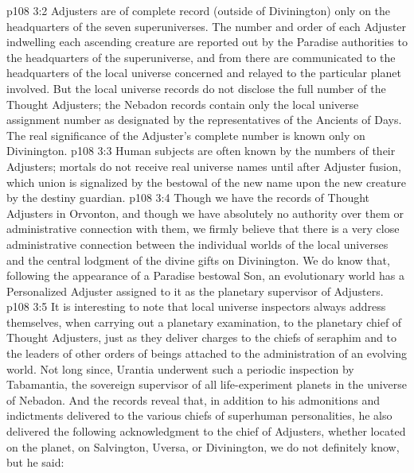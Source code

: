 \vs p108 3:2 Adjusters are of complete record (outside of Divinington) only on the headquarters of the seven superuniverses. The number and order of each Adjuster indwelling each ascending creature are reported out by the Paradise authorities to the headquarters of the superuniverse, and from there are communicated to the headquarters of the local universe concerned and relayed to the particular planet involved. But the local universe records do not disclose the full number of the Thought Adjusters; the Nebadon records contain only the local universe assignment number as designated by the representatives of the Ancients of Days. The real significance of the Adjuster’s complete number is known only on Divinington.
\vs p108 3:3 Human subjects are often known by the numbers of their Adjusters; mortals do not receive real universe names until after Adjuster fusion, which union is signalized by the bestowal of the new name upon the new creature by the destiny guardian.
\vs p108 3:4 Though we have the records of Thought Adjusters in Orvonton, and though we have absolutely no authority over them or administrative connection with them, we firmly believe that there is a very close administrative connection between the individual worlds of the local universes and the central lodgment of the divine gifts on Divinington. We do know that, following the appearance of a Paradise bestowal Son, an evolutionary world has a Personalized Adjuster assigned to it as the planetary supervisor of Adjusters.
\pc \vs p108 3:5 It is interesting to note that local universe inspectors always address themselves, when carrying out a planetary examination, to the planetary chief of Thought Adjusters, just as they deliver charges to the chiefs of seraphim and to the leaders of other orders of beings attached to the administration of an evolving world. Not long since, Urantia underwent such a periodic inspection by Tabamantia, the sovereign supervisor of all life\hyp{}experiment planets in the universe of Nebadon. And the records reveal that, in addition to his admonitions and indictments delivered to the various chiefs of superhuman personalities, he also delivered the following acknowledgment to the chief of Adjusters, whether located on the planet, on Salvington, Uversa, or Divinington, we do not definitely know, but he said:
